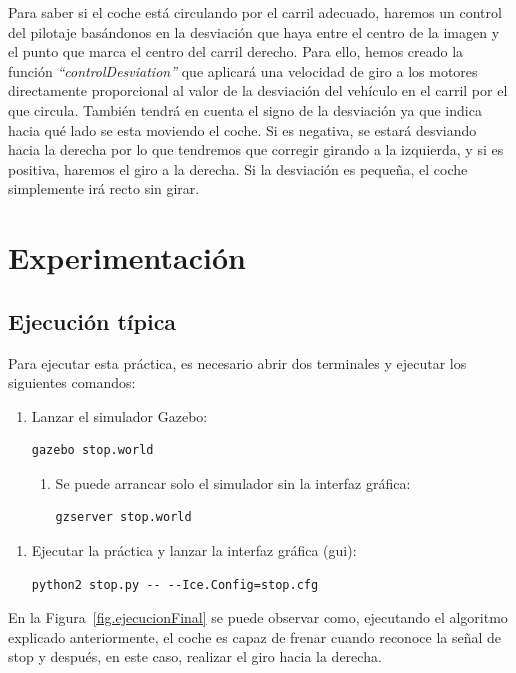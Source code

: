 Para saber si el coche está circulando por el carril adecuado, haremos un control del pilotaje basándonos en la desviación que haya entre el centro de la imagen y el punto que marca el centro del carril derecho. Para ello, hemos creado la función \textit{``controlDesviation''} que aplicará una velocidad de giro a los motores directamente proporcional al valor de la desviación del vehículo en el carril por el que circula. También tendrá en cuenta el signo de la desviación ya que indica hacia qué lado se esta moviendo el coche. Si es negativa, se estará desviando hacia la derecha por lo que tendremos que corregir girando a la izquierda, y si es positiva, haremos el giro a la derecha. Si la desviación es pequeña, el coche simplemente irá recto sin girar.

\section{Experimentación}

\subsection{Ejecución típica} 
Para ejecutar esta práctica, es necesario abrir dos terminales y ejecutar los siguientes comandos:

\begin{enumerate}[1.]
\item Lanzar el simulador Gazebo:
	\begin{lstlisting}[frame=single]
		gazebo stop.world
	\end{lstlisting} 
	\begin{enumerate}[1b.]
	\item Se puede arrancar solo el simulador sin la interfaz gráfica:
		\begin{lstlisting}[frame=single]
		 	gzserver stop.world
		\end{lstlisting}
	\end{enumerate}
\end{enumerate}

\begin{enumerate}[2.]
\item	Ejecutar la práctica y lanzar la interfaz gráfica (\acrshort{gui}): 
	\begin{lstlisting}[frame=single]
		python2 stop.py -- --Ice.Config=stop.cfg
	\end{lstlisting} 
\end{enumerate}

En la Figura~\ref{fig.ejecucionFinal} se puede observar como, ejecutando el algoritmo explicado anteriormente, el coche es capaz de frenar cuando reconoce la señal de stop y después, en este caso, realizar el giro hacia la derecha. \\

